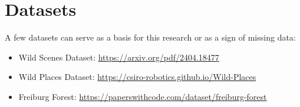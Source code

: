 \documentclass[runningheads]{llncs}
\begin{document}
\section{Datasets}
A few datasets can serve as a basis for this research or as a sign of missing data:
\begin{itemize}
    \item Wild Scenes Dataset: \url{https://arxiv.org/pdf/2404.18477}
    \item Wild Places Dataset: \url{https://csiro-robotics.github.io/Wild-Places}
    \item Freiburg Forest: \url{https://paperswithcode.com/dataset/freiburg-forest}
\end{itemize}


\printbibliography
\end{document}
